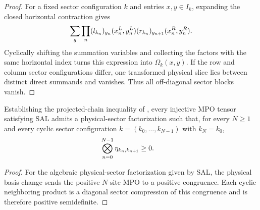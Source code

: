 \begin{proof}
    \leanok
    For a fixed sector configuration $k$ and entries $x,y\in I_k$, expanding
    the closed horizontal contraction gives
    \begin{align}
        \sum_g\prod_n
        (l_{k_n})_{g_n}(x_n^L,y_n^L)
        (r_{k_n})_{g_{n+1}}(x_n^R,y_n^R).
        \notag
    \end{align}
    Cyclically shifting the summation variables and collecting the factors
    with the same horizontal index turns this expression into
    $\Omega_k(x,y)$. If the row and column sector configurations differ,
    one transformed physical slice lies between distinct direct summands and
    vanishes. Thus all off-diagonal sector blocks vanish.
\end{proof}

\begin{corollary}
    \label{cor:mpdo_sal_positive_cyclic_sector_products}
    \leanok
    Establishing the projected-chain inequality of
    \cite[Appendix~C.2, Lemma~C.4, lines~1446--1450]{Cirac2016MPDO_arXiv},
    every injective MPO tensor satisfying SAL admits a physical-sector
    factorization such that, for every $N\geq1$ and every cyclic sector
    configuration $k=(k_0,\ldots,k_{N-1})$ with $k_N=k_0$,
    \begin{align}
        \bigotimes_{n=0}^{N-1}\eta_{k_n,k_{n+1}}
         & \geq0.
        \notag
    \end{align}
\end{corollary}

\begin{proof}
    \leanok
    For the algebraic physical-sector factorization given by SAL, the physical
    basis change sends the positive $N$-site MPO to a positive congruence.
    Each cyclic neighboring product is a diagonal sector compression of this
    congruence and is therefore positive semidefinite.
\end{proof}

